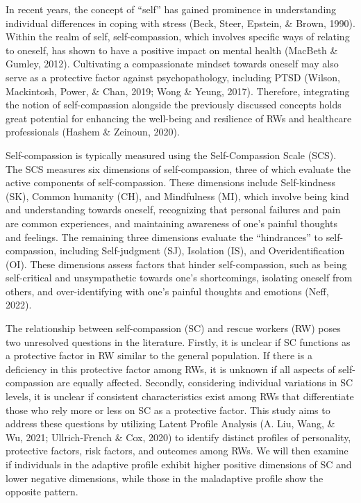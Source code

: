 \documentclass[
  man]{apa7}
\begin{document}
In recent years, the concept of ``self'' has gained prominence in understanding individual differences in coping with stress (Beck, Steer, Epstein, \& Brown, 1990). Within the realm of self, self-compassion, which involves specific ways of relating to oneself, has shown to have a positive impact on mental health (MacBeth \& Gumley, 2012). Cultivating a compassionate mindset towards oneself may also serve as a protective factor against psychopathology, including PTSD (Wilson, Mackintosh, Power, \& Chan, 2019; Wong \& Yeung, 2017). Therefore, integrating the notion of self-compassion alongside the previously discussed concepts holds great potential for enhancing the well-being and resilience of RWs and healthcare professionals (Hashem \& Zeinoun, 2020).

Self-compassion is typically measured using the Self-Compassion Scale (SCS). The SCS measures six dimensions of self-compassion, three of which evaluate the active components of self-compassion. These dimensions include Self-kindness (SK), Common humanity (CH), and Mindfulness (MI), which involve being kind and understanding towards oneself, recognizing that personal failures and pain are common experiences, and maintaining awareness of one's painful thoughts and feelings. The remaining three dimensions evaluate the ``hindrances'' to self-compassion, including Self-judgment (SJ), Isolation (IS), and Overidentification (OI). These dimensions assess factors that hinder self-compassion, such as being self-critical and unsympathetic towards one's shortcomings, isolating oneself from others, and over-identifying with one's painful thoughts and emotions (Neff, 2022).

The relationship between self-compassion (SC) and rescue workers (RW) poses two unresolved questions in the literature. Firstly, it is unclear if SC functions as a protective factor in RW similar to the general population. If there is a deficiency in this protective factor among RWs, it is unknown if all aspects of self-compassion are equally affected. Secondly, considering individual variations in SC levels, it is unclear if consistent characteristics exist among RWs that differentiate those who rely more or less on SC as a protective factor. This study aims to address these questions by utilizing Latent Profile Analysis (A. Liu, Wang, \& Wu, 2021; Ullrich-French \& Cox, 2020) to identify distinct profiles of personality, protective factors, risk factors, and outcomes among RWs. We will then examine if individuals in the adaptive profile exhibit higher positive dimensions of SC and lower negative dimensions, while those in the maladaptive profile show the opposite pattern.
\end{document}

